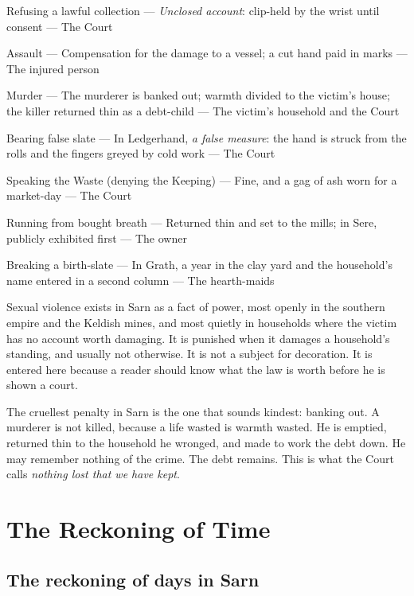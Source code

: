 \documentclass{design/chronicle}
\begin{document}
Refusing a lawful collection — \emph{Unclosed account}: clip-held by the wrist until consent — The Court\par

Assault — Compensation for the damage to a vessel; a cut hand paid in marks — The injured person\par

Murder — The murderer is banked out; warmth divided to the victim’s house; the killer returned thin as a debt-child — The victim’s household and the Court\par

Bearing false slate — In Ledgerhand, \emph{a false measure}: the hand is struck from the rolls and the fingers greyed by cold work — The Court\par

Speaking the Waste (denying the Keeping) — Fine, and a gag of ash worn for a market-day — The Court\par

Running from bought breath — Returned thin and set to the mills; in Sere, publicly exhibited first — The owner\par

Breaking a birth-slate — In Grath, a year in the clay yard and the household’s name entered in a second column — The hearth-maids\par

Sexual violence exists in Sarn as a fact of power, most openly in the southern empire and the Keldish mines, and most quietly in households where the victim has no account worth damaging. It is punished when it damages a household’s standing, and usually not otherwise. It is not a subject for decoration. It is entered here because a reader should know what the law is worth before he is shown a court.

The cruellest penalty in Sarn is the one that sounds kindest: banking out. A murderer is not killed, because a life wasted is warmth wasted. He is emptied, returned thin to the household he wronged, and made to work the debt down. He may remember nothing of the crime. The debt remains. This is what the Court calls \emph{nothing lost that we have kept}.

\chapter*{The Reckoning of Time}
\section*{The reckoning of days in Sarn}
\end{document}

